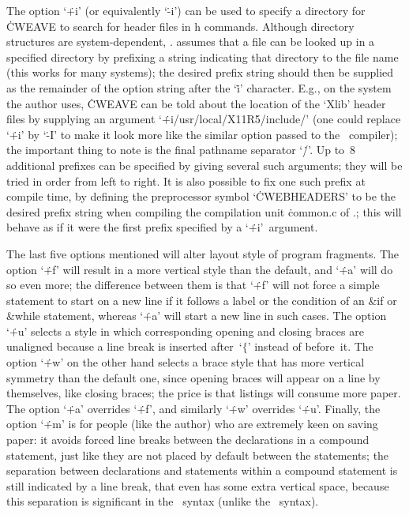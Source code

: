 The option `\.{+i}' (or equivalently `\.{-i}') can be used to specify a
directory for \.{CWEAVE} to search for header files in \:h commands.
Although directory structures are system-dependent, \CWEB. assumes that a
file can be looked up in a specified directory by prefixing a string
indicating that directory to the file name (this works for many systems);
the desired prefix string should then be supplied as the remainder of the
option string after the `\.i' character. E.g., on the  system the
author uses, \.{CWEAVE} can be told about the location of the `Xlib' header
files by supplying an argument `\.{+i/usr/local/X11R5/include/}' (one could
replace `\.{+i}' by `\.{-I}' to make it look more like the similar option
passed to the \Cee~compiler); the important thing to note is the final
pathname separator `\./'. Up to~8 additional prefixes can be specified by
giving several such arguments; they will be tried in order from left to
right. It is also possible to fix one such prefix at compile time, by
defining the preprocessor symbol `\.{CWEBHEADERS}' to be the desired prefix
string when compiling the compilation unit \.{common.c} of \CWEB.; this will
behave as if it were the first prefix specified by a `\.{+i}'~argument.

The last five options mentioned will alter layout style of program fragments.
The option `\.{+f}' will result in a more vertical style than the default,
and `\.{+a}' will do so even more; the difference between them is that
`\.{+f}' will not force a simple statement to start on a new line if it
follows a label or the condition of an \&{if} or \&{while} statement,
whereas `\.{+a}' will start a new line in such cases. The option `\.{+u}'
selects a style in which corresponding opening and closing braces are
unaligned because a line break is inserted after~`$\{$' instead of before~it.
The option `\.{+w}' on the other hand selects a brace style that has more
vertical symmetry than the default one, since opening braces will appear on
a line by themselves, like closing braces; the price is that listings will
consume more paper. The option `\.{+a}' overrides `\.{+f}', and similarly
`\.{+w}' overrides `\.{+u}'.  Finally, the option `\.{+m}' is for people
(like the author) who are extremely keen on saving paper: it avoids forced
line breaks between the declarations in a compound statement, just like they
are not placed by default between the statements; the separation between
declarations and statements within a compound statement is still indicated by
a line break, that even has some extra vertical space, because this
separation is significant in the \Cee~syntax (unlike the \Cpp~syntax).

